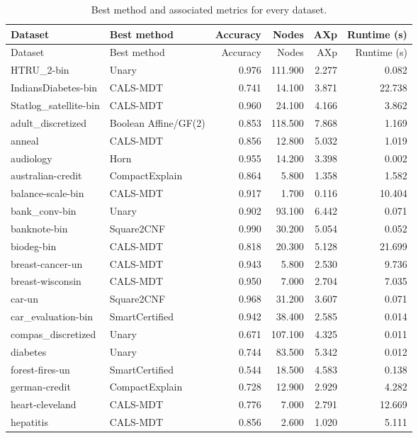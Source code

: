 \begingroup
\small
\setlength{\tabcolsep}{3pt}
\begin{longtable}{llrrrr}
\caption{Best method and associated metrics for every dataset.}\label{tab:dataset-summary}\\
\toprule
Dataset & Best method & Accuracy & Nodes & AXp & Runtime (s) \\
\midrule
\endfirsthead
\toprule
Dataset & Best method & Accuracy & Nodes & AXp & Runtime (s) \\
\midrule
\endhead
HTRU\_2-bin & Unary & 0.976 & 111.900 & 2.277 & 0.082 \\
IndiansDiabetes-bin & CALS-MDT & 0.741 & 14.100 & 3.871 & 22.738 \\
Statlog\_satellite-bin & CALS-MDT & 0.960 & 24.100 & 4.166 & 3.862 \\
adult\_discretized & Boolean Affine/GF(2) & 0.853 & 118.500 & 7.868 & 1.169 \\
anneal & CALS-MDT & 0.856 & 12.800 & 5.032 & 1.019 \\
audiology & Horn & 0.955 & 14.200 & 3.398 & 0.002 \\
australian-credit & CompactExplain & 0.864 & 5.800 & 1.358 & 1.582 \\
balance-scale-bin & CALS-MDT & 0.917 & 1.700 & 0.116 & 10.404 \\
bank\_conv-bin & Unary & 0.902 & 93.100 & 6.442 & 0.071 \\
banknote-bin & Square2CNF & 0.990 & 30.200 & 5.054 & 0.052 \\
biodeg-bin & CALS-MDT & 0.818 & 20.300 & 5.128 & 21.699 \\
breast-cancer-un & CALS-MDT & 0.943 & 5.800 & 2.530 & 9.736 \\
breast-wisconsin & CALS-MDT & 0.950 & 7.000 & 2.704 & 7.035 \\
car-un & Square2CNF & 0.968 & 31.200 & 3.607 & 0.071 \\
car\_evaluation-bin & SmartCertified & 0.942 & 38.400 & 2.585 & 0.014 \\
compas\_discretized & Unary & 0.671 & 107.100 & 4.325 & 0.011 \\
diabetes & Unary & 0.744 & 83.500 & 5.342 & 0.012 \\
forest-fires-un & SmartCertified & 0.544 & 18.500 & 4.583 & 0.138 \\
german-credit & CompactExplain & 0.728 & 12.900 & 2.929 & 4.282 \\
heart-cleveland & CALS-MDT & 0.776 & 7.000 & 2.791 & 12.669 \\
hepatitis & CALS-MDT & 0.856 & 2.600 & 1.020 & 5.111 \\

\end{longtable}
